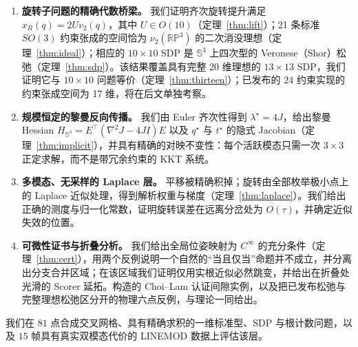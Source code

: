 \begin{enumerate}
\item \textbf{旋转子问题的精确代数桥梁。} 我们证明齐次旋转提升满足 $x_R(q)=2Uv_2(q)$，其中 $U\in O(10)$（定理~\ref{thm:lift}）；21 条标准 $SO(3)$ 约束张成的空间恰为 $\nu_2(\mathbb{RP}^3)$ 的二次消没理想（定理~\ref{thm:ideal}）；相应的 $10\times10$ SDP 是 $\mathbb{S}^3$ 上四次型的 Veronese（Shor）松弛（定理~\ref{thm:sdp}）。该结果覆盖具有完整 20 维理想的 $13\times13$ SDP，我们证明它与 $10\times10$ 问题等价（定理~\ref{thm:thirteen}）；已发布的 $24$ 约束实现的约束张成空间为 17 维，将在后文单独考察。
\item \textbf{规模恒定的黎曼反向传播。} 我们由 Euler 齐次性得到 $\lambda^\star=4J$，给出黎曼 Hessian $H_{\mathbb{S}^3}=E^\top(\nabla^2J-4JI)E$ 以及 $q^\star$ 与 $t^\star$ 的隐式 Jacobian（定理~\ref{thm:implicit}），并具有精确的对映不变性：每个活跃模态只需一次 $3\times3$ 正定求解，而不是带冗余约束的 KKT 系统。
\item \textbf{多模态、无采样的 Laplace 层。} 平移被精确积掉；旋转由全部枚举极小点上的 Laplace 近似处理，得到解析权重与梯度（定理~\ref{thm:laplace}）。我们给出正确的测度与归一化常数，证明旋转误差在远离分岔处为 $O(\tau)$，并确定近似失效的位置。
\item \textbf{可微性证书与折叠分析。} 我们给出全局位姿映射为 $C^\infty$ 的充分条件（定理~\ref{thm:cert}），用两个反例说明一个自然的“当且仅当”命题并不成立，并分离出分支合并区域；在该区域我们证明仅用实根近似必然跳变，并给出在折叠处光滑的 Scorer 延拓。构造的 Choi--Lam 认证间隙实例，以及把已发布松弛与完整理想松弛区分开的物理六点反例，与理论一同给出。
\end{enumerate}

我们在 $81$ 点合成交叉网格、具有精确求积的一维标准型、SDP 与根计数问题，以及 $15$ 帧具有真实双模态代价的 LINEMOD 数据上评估该层。
